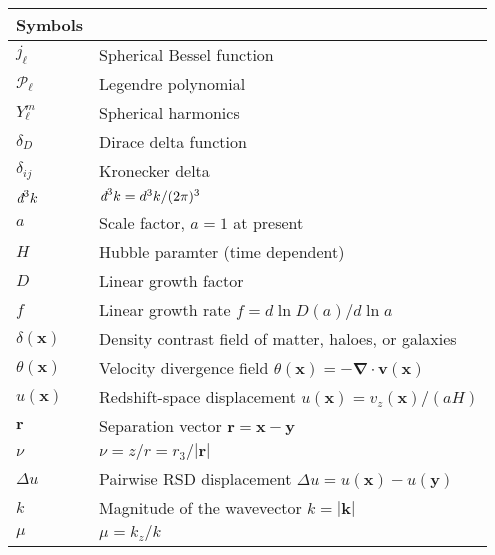 \documentclass[a4paper,11pt, fleqn]{article}
\newcommand{\dbar}{\textit{\dj}}
\begin{document}
\begin{center}
  \begin{tabular}{ll}
    Symbols & \\
    \hline
    $j_\ell$ & Spherical Bessel function\\
    $\mathcal{P}_\ell$ & Legendre polynomial\\
    $Y_\ell^m$ & Spherical harmonics\\
    $\delta_D$ & Dirace delta function\\
    $\delta_{ij}$ & Kronecker delta\\
    $\dbar^3 k$ & $\dbar^3 k = d^3 k / (2\pi)^3$\\ 
    \hline
    $a$ & Scale factor, $a=1$ at present\\
    $H$ & Hubble paramter (time dependent)\\
    $D$ & Linear growth factor\\
    $f$ & Linear growth rate $f = d \ln D(a)/d\ln a$\\
    $\delta(\bm{x})$ & Density contrast field of matter, haloes, or galaxies\\
    
    $\theta(\bm{x})$ & Velocity divergence field
    $\theta(\bm{x}) = -\bm{\nabla} \cdot \bm{v}(\bm{x})$\\
    $u(\bm{x})$ & Redshift-space displacement $u(\bm{x}) = v_z(\bm{x})/(aH)$\\
    $\bm{r}$ & Separation vector $\bm{r} = \bm{x} - \bm{y}$\\
    $\nu$   & $\nu = z/r = r_3/|\bm{r}|$\\
    $\Delta u$ & Pairwise RSD displacement $\Delta u = u(\bm{x}) - u(\bm{y})$\\
    $k$ & Magnitude of the wavevector $k = |\bm{k}|$\\
    $\mu$ & $\mu=k_z/k$\\
    \hline
  \end{tabular}
\end{center}

%
%
%
\end{document}
